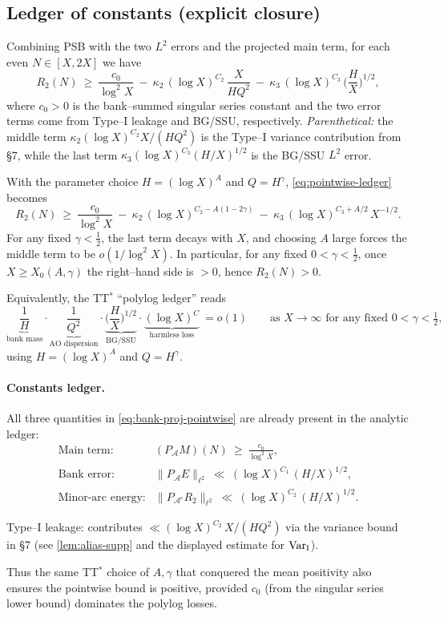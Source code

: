 \subsection{Ledger of constants (explicit closure)}

Combining PSB with the two $L^2$ errors and the projected main term, for each even $N\in[X,2X]$ we have
\begin{equation}\label{eq:pointwise-ledger}
R_2(N)\ \ge\ \frac{c_0}{\log^2 X}\ -\ \kappa_2\,(\log X)^{C_2}\,\frac{X}{H Q^2}\ -\ \kappa_3\,(\log X)^{C_3}\,\Big(\frac{H}{X}\Big)^{1/2},
\end{equation}
where $c_0>0$ is the bank–summed singular series constant and the two error terms come from Type–I leakage and BG/SSU, respectively. 
\noindent\emph{Parenthetical:} the middle term \(\kappa_2(\log X)^{C_2} X/(H Q^2)\) is the Type--I
variance contribution from §7, while the last term \(\kappa_3(\log X)^{C_3}(H/X)^{1/2}\) is the BG/SSU \(L^2\) error.


With the parameter choice $H=(\log X)^A$ and $Q=H^\gamma$, \eqref{eq:pointwise-ledger} becomes
\[
R_2(N)\ \ge\ \frac{c_0}{\log^2 X}\ -\ \kappa_2\,(\log X)^{C_2-A(1-2\gamma)}\ -\ \kappa_3\,(\log X)^{C_3+A/2}\,X^{-1/2}.
\]
For any fixed $\gamma<\tfrac12$, the last term decays with $X$, and choosing $A$ large forces the middle term to be $o(1/\log^2 X)$. In particular, for any fixed $0<\gamma<\tfrac12$, once $X\ge X_0(A,\gamma)$ the right–hand side is $>0$, hence $R_2(N)>0$.

Equivalently, the TT$^\ast$ “polylog ledger” reads
\[
\underbrace{\frac{1}{H}}_{\text{bank mass}}
\cdot
\underbrace{\frac{1}{Q^2}}_{\text{AO dispersion}}
\cdot
\underbrace{\Big(\frac{H}{X}\Big)^{1/2}}_{\text{BG/SSU}}
\cdot
\underbrace{(\log X)^C}_{\text{harmless loss}}
\ = o(1)\qquad\text{as $X\to\infty$ for any fixed $0<\gamma<\tfrac12$,}
\]
using $H=(\log X)^A$ and $Q=H^\gamma$.

\paragraph{Constants ledger.}
All three quantities in \eqref{eq:bank-proj-pointwise} are already present in the analytic ledger:
\[
\begin{array}{rl}
\text{Main term:} & (P_{\mathcal{A}} M)(N)\ \ge\ \displaystyle\frac{c_0}{\log^2 X}, \\[1.0ex]
\text{Bank error:} & \|P_{\mathcal{A}}E\|_{\ell^2}\ \ll\ (\log X)^{C_1}\,(H/X)^{1/2}, \\[0.5ex]
\text{Minor-arc energy:} & \|P_{\mathcal{A}^c}R_2\|_{\ell^2}\ \ll\ (\log X)^{C_2}\,(H/X)^{1/2}.
\end{array}
\]

Type--I leakage: contributes \(\ll (\log X)^{C_2}\,X/(H Q^2)\) via the variance bound in §7 (see \ref{lem:alias-supp} and the displayed estimate for \(\operatorname{Var}_{\mathrm{I}}\)).

Thus the same TT$^\ast$ choice of $A,\gamma$ that conquered the mean positivity also ensures the pointwise bound is positive, provided $c_0$ (from the singular series lower bound) dominates the polylog losses.
